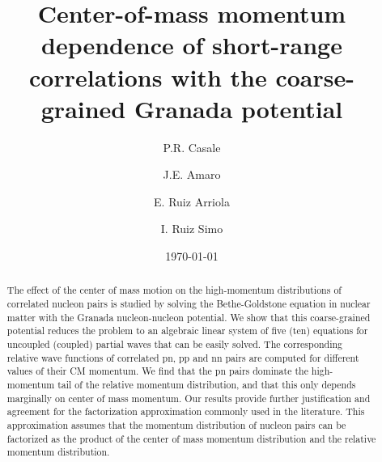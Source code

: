 \documentclass[aps,twocolumn,showpacs,preprintnumbers,amsmath,amssymb,nofootinbib,superscriptaddress,showkeys,noeprint]{revtex4-1}
\begin{document}
\title{Center-of-mass momentum dependence of short-range correlations
  with the coarse-grained Granada potential}

\author{P.R. Casale}

\author{J.E. Amaro}

\author{E. Ruiz Arriola}

\author{I. Ruiz Simo}


\date{\today}

\begin{abstract} 
The effect of the center of mass motion on the high-momentum
distributions of correlated nucleon pairs is studied by solving the
Bethe-Goldstone equation in nuclear matter with the Granada
nucleon-nucleon potential.  We show that this coarse-grained potential
reduces the problem to an algebraic linear system of five (ten)
equations for uncoupled (coupled) partial waves that can be easily
solved. The corresponding relative wave functions of correlated pn, pp
and nn pairs are computed for different values of their CM momentum.
We find that the pn pairs dominate the high-momentum tail of the
relative momentum distribution, and that this only depends marginally
on center of mass momentum. Our results provide further justification
and agreement for the factorization approximation commonly used in the
literature.  This approximation assumes that the momentum distribution
of nucleon pairs can be factorized as the product of the center of
mass momentum distribution and the relative momentum distribution.
\end{abstract}
\end{document}
